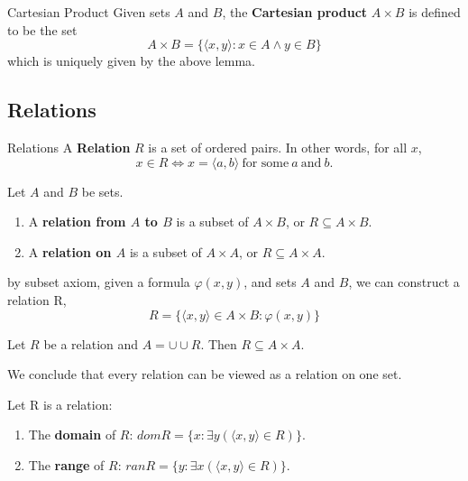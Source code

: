 \begin{definition}{Cartesian Product}{}
    Given sets $A$ and $B$, the \textbf{Cartesian product} $A \times B$
    is defined to be the set
    \begin{equation*}
        A \times B = \{\langle x,y \rangle : x \in A \land y \in B\}
    \end{equation*}
    which is uniquely given by the above lemma.
\end{definition}

\subsection{Relations}
\begin{definition}{Relations}{}
    A \textbf{Relation} $R$ is a set of ordered pairs. In other words,
    for all $x$,
    \begin{equation*}
        x \in R \iff x = \langle a,b \rangle \ \text{for
        some}\ a\ \text{and}\ b.
    \end{equation*}
\end{definition}

\begin{definition}{}{}
    Let $A$ and $B$ be sets.
    \begin{enumerate}
        \item A \textbf{relation from $A$ to $B$} is a subset of $A
            \times B$, or $R \subseteq A \times B$.
        \item A \textbf{relation on $A$} is a subset of $A \times A$, or
            $R \subseteq A \times A$.
    \end{enumerate}
\end{definition}

\begin{remarks}
    by subset axiom, given a formula $\varphi(x,y)$, and sets $A$ and
    $B$, we can construct a relation R,
    \begin{equation*}
        R = \{\langle x,y \rangle \in A \times B : \varphi(x,y)\}
    \end{equation*}
\end{remarks}

\begin{lemma}{}{}
    Let $R$ be a relation and $A = \cup \cup R$. Then $R \subseteq A \times A$.
\end{lemma}

We conclude that every relation can be viewed as a relation on one set.

\begin{definition}{}{}
    Let R is a relation:
    \begin{enumerate}

        \item The \textbf{domain} of $R$: $dom{R} = \{x : \exists y
            (\langle x,y \rangle \in R)\}$.
        \item The \textbf{range} of $R$: $ran{R} = \{y : \exists x
            (\langle x,y \rangle \in R)\}$.

    \end{enumerate}
\end{definition}


